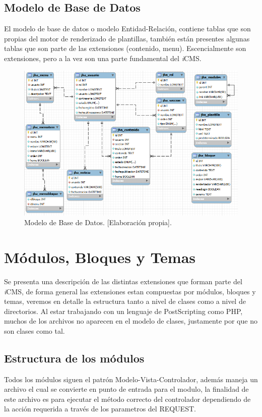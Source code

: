 

\subsection{Modelo de Base de Datos}
El modelo de base de datos o modelo Entidad-Relaci\'on, contiene tablas que son propias del motor de renderizado de plantillas, tambi\'en est\'an presentes algunas tablas que son parte de las extensiones (contenido, menu). Escencialmente son extensiones, pero a la vez son una parte fundamental del \textit{i}CMS.

\begin{figure}[h]
\centering
\includegraphics[scale=.6, keepaspectratio=true]{imagenes/12_imagen.png}
\caption{Modelo de Base de Datos. [Elaboraci\'on propia].}
\end{figure}

\section{M\'odulos, Bloques y Temas}
Se presenta una descripci\'on de las distintas extensiones que forman parte del \textit{i}CMS, de forma general las extensiones estan compuestas por m\'odulos, bloques y temas, veremos en detalle la estructura tanto a nivel de clases como a nivel de directorios. Al estar trabajando con un lenguaje de PostScripting como PHP, muchos de los archivos no aparecen en el modelo de clases, justamente por que no son clases como tal.

\subsection{Estructura de los m\'odulos}
Todos los m\'odulos siguen el patr\'on Modelo-Vista-Controlador, adem\'as maneja un archivo el cual se convierte en punto de entrada para el modulo, la finalidad de este archivo es para ejecutar el m\'etodo correcto del controlador dependiendo de la acci\'on requerida a trav\'es de los parametros del REQUEST.

